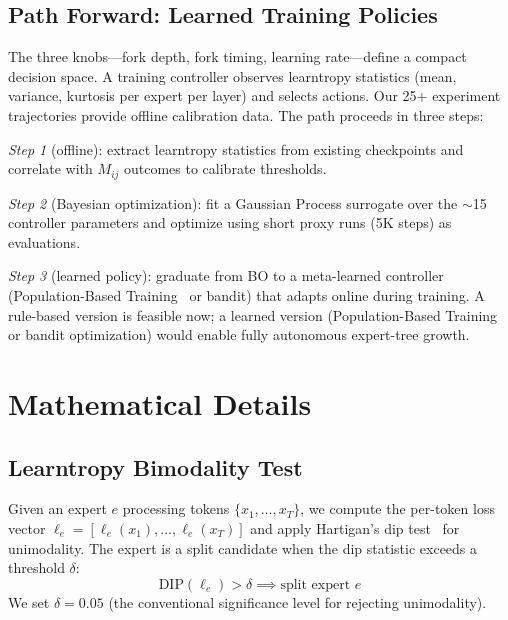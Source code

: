 \documentclass{article}
\begin{document}
\subsection{Path Forward: Learned Training Policies}

The three knobs---fork depth, fork timing, learning rate---define a compact
decision space. A training controller observes learntropy statistics (mean,
variance, kurtosis per expert per layer) and selects actions. Our 25+
experiment trajectories provide offline calibration data. The path proceeds
in three steps:

\emph{Step 1} (offline): extract learntropy statistics from existing
checkpoints and correlate with $M_{ij}$ outcomes to calibrate thresholds.

\emph{Step 2} (Bayesian optimization): fit a Gaussian Process surrogate over
the $\sim$15 controller parameters and optimize using short proxy runs (5K
steps) as evaluations.

\emph{Step 3} (learned policy): graduate from BO to a meta-learned controller
(Population-Based Training~\cite{jaderberg2017pbt} or bandit) that adapts
online during training.
A rule-based version is feasible now; a learned version
(Population-Based Training~\cite{jaderberg2017pbt} or bandit optimization)
would enable fully autonomous expert-tree growth.

\appendix

\section{Mathematical Details}
\label{app:math}

\subsection{Learntropy Bimodality Test}

Given an expert $e$ processing tokens $\{x_1, \ldots, x_T\}$, we compute the
per-token loss vector $\ell_e = [\ell_e(x_1), \ldots, \ell_e(x_T)]$ and apply
Hartigan's dip test~\cite{hartigan1985dip} for unimodality. The expert is a
split candidate when the dip statistic exceeds a threshold $\delta$:
\begin{equation}
    \text{DIP}(\ell_e) > \delta \implies \text{split expert } e
\end{equation}
We set $\delta = 0.05$ (the conventional significance level for rejecting
unimodality).
\end{document}
